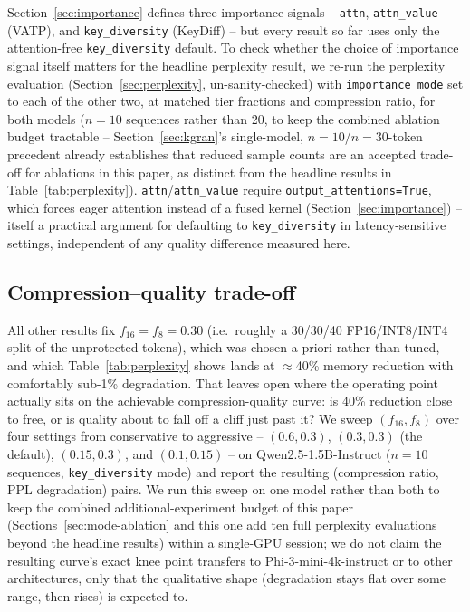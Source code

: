 \documentclass[conference]{IEEEtran}
\begin{document}
Section~\ref{sec:importance} defines three importance signals -- \texttt{attn},
\texttt{attn\_value} (VATP), and \texttt{key\_diversity} (KeyDiff) -- but every result
so far uses only the attention-free \texttt{key\_diversity} default. To check whether
the choice of importance signal itself matters for the headline perplexity result, we
re-run the perplexity evaluation (Section~\ref{sec:perplexity}, un-sanity-checked) with
\texttt{importance\_mode} set to each of the other two, at matched tier fractions and
compression ratio, for both models ($n{=}10$ sequences rather than 20, to keep the
combined ablation budget tractable -- Section~\ref{sec:kgran}'s single-model,
$n{=}10$/$n{=}30$-token precedent already establishes that reduced sample counts are an
accepted trade-off for ablations in this paper, as distinct from the headline results in
Table~\ref{tab:perplexity}). \texttt{attn}/\texttt{attn\_value} require
\texttt{output\_attentions=True}, which forces eager attention instead of a fused kernel
(Section~\ref{sec:importance}) -- itself a practical argument for defaulting to
\texttt{key\_diversity} in latency-sensitive settings, independent of any quality
difference measured here.

\subsection{Compression--quality trade-off}
\label{sec:pareto}

All other results fix $f_{16}{=}f_8{=}0.30$ (i.e.\ roughly a 30/30/40 FP16/INT8/INT4
split of the unprotected tokens), which was chosen a priori rather than tuned, and
which Table~\ref{tab:perplexity} shows lands at $\approx$40\% memory reduction with
comfortably sub-1\% degradation. That leaves open where the operating point actually
sits on the achievable compression-quality curve: is 40\% reduction close to free, or
is quality about to fall off a cliff just past it? We sweep $(f_{16}, f_8)$ over four
settings from conservative to aggressive -- $(0.6, 0.3)$, $(0.3, 0.3)$ (the default),
$(0.15, 0.3)$, and $(0.1, 0.15)$ -- on Qwen2.5-1.5B-Instruct ($n{=}10$ sequences,
\texttt{key\_diversity} mode) and report the resulting (compression ratio, PPL
degradation) pairs. We run this sweep on one model rather than both to keep the
combined additional-experiment budget of this paper (Sections~\ref{sec:mode-ablation}
and this one add ten full perplexity evaluations beyond the headline results) within a
single-GPU session; we do not claim the resulting curve's exact knee point transfers
to Phi-3-mini-4k-instruct or to other architectures, only that the qualitative
shape (degradation stays flat over some range, then rises) is expected to.
\end{document}
